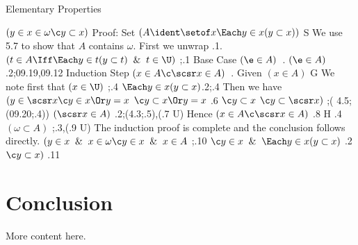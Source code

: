 \documentclass{article}
\begin{document}
\noindent{}
Elementary Properties


 $(y \in x \in \omega \c y \subset x)$
    \lineb Proof: Set 
	 $(A \ident \setof x \Each y\in x(y\subset x))$ \By S
	\linea We use 5.7 to show that $A$ contains $\omega$. First we unwrap .1.
	 $(t \in A \Iff \Each y \in t (y \subset t) \And t \in \U)$ ;.1
    \lineb Base Case $(\e \in A )$~.  
	 $(\e \in A)$ \By .2;09.19,09.12
    \lineb Induction Step $(x \in A \c \scsr x \in A)$~.
	\linea Given
	  $(x \in A )$  \By G
\linea We note first that
	 $(x \in \U)$  ;.4
	 $\Each y \in x(y \subset  x)$\By .2;.4
\linea Then we have
	 $(y \in \scsr x \c y \in x \Or y = x$  
    \lined $\c y \subset x \Or y = x$  \By .6
    \lined $\c y \subset x $  
    \lined $\c y \subset \scsr x )$ ;( 4.5;(09.20;.4))
	 $(\scsr x \in A)$ \By .2;(4.3;.5),(.7 U)
\linea Hence
	 $(x \in A \c \scsr x \in A)$ \By .8 H .4
  $(\omega \subset A)$ ;.3,(.9 U)
\linea The induction proof is complete and the conclusion follows directly.
  $(y \in x \And x \in \omega\c y \in x \And x \in A$ ;.10
    \linee $\c y \in x \And \Each y \in x(y \subset x)$ \By .2
    \linee $\c y \subset x)$
    \lineb \Bye .11 


\section{Conclusion}

More content here.
\end{document}
